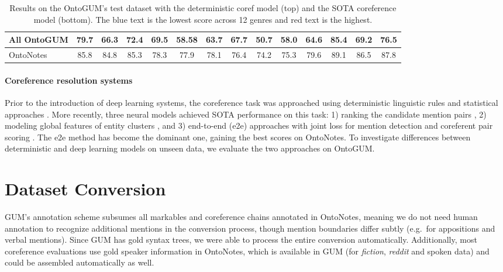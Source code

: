 \documentclass[11pt,a4paper]{article}
\begin{document}
\begin{table*}[t!hb]
\begin{tabular}{l|cccccccccc|ccc}
    \hline
    \rule{0pt}{2ex}All OntoGUM & 79.7 & 66.3 & 72.4 & 69.5 & 58.58 & 63.7 & 67.7 & 50.7 & 58.0 & 64.6 & 85.4 & 69.2 & 76.5\\
    
    \hline    
    
    \rule{0pt}{2ex}OntoNotes & 85.8 & 84.8 & 85.3 & 78.3 & 77.9 & 78.1 & 76.4 & 74.2 & 75.3 & 79.6 & 89.1 & 86.5 & 87.8\\
    
    \hline
\end{tabular}
    \caption{Results on the OntoGUM's test dataset with the deterministic coref model (top) and the SOTA coreference model (bottom). The blue text is the lowest score across 12 genres and red text is the highest.}
    \label{tab:res}
\end{table*}

\paragraph{Coreference resolution systems} Prior to the introduction of deep learning systems, the coreference task was approached using deterministic linguistic rules \citep{lee-etal-2013-deterministic, recasens-etal-2013-life} and statistical approaches
\citep{durrett-klein-2013-easy, durrett-klein-2014-joint}.
More recently, three neural models achieved SOTA performance on this task: 1) ranking the candidate mention pairs \citep{wiseman-etal-2015-learning,clark-manning-2016-deep}, 2) modeling global features of entity clusters \citep{clark-manning-2015-entity, clark-manning-2016-improving, wiseman-etal-2016-learning}, and 3) end-to-end (e2e) approaches with joint loss for mention detection and coreferent pair scoring \cite{lee-etal-2017-end, lee-etal-2018-higher, fei-etal-2019-end}. The e2e method has become the dominant one, gaining the best scores on OntoNotes. To investigate differences between deterministic and deep learning models on unseen data, we evaluate the two approaches on OntoGUM.


\section{Dataset Conversion}
GUM's annotation scheme subsumes all markables and coreference chains annotated in OntoNotes, meaning we do not need human annotation to recognize additional mentions in the conversion process, though mention boundaries differ subtly (e.g.~for appositions and verbal mentions). Since GUM has gold syntax trees, we were able to process the entire conversion automatically. Additionally, most coreference evaluations use gold speaker information in OntoNotes, which is available in GUM (for \textit{fiction}, \textit{reddit} and spoken data) and could be assembled automatically as well.
\end{document}
